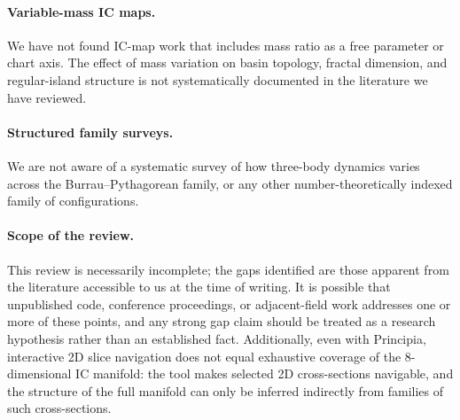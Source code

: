 \documentclass[11pt,a4paper]{article}
\begin{document}
\paragraph{Variable-mass IC maps.}
We have not found IC-map work that includes mass ratio as a free parameter or chart axis.
The effect of mass variation on basin topology, fractal dimension, and regular-island structure
is not systematically documented in the literature we have reviewed.

\paragraph{Structured family surveys.}
We are not aware of a systematic survey of how three-body dynamics varies across the
Burrau--Pythagorean family, or any other number-theoretically indexed family of configurations.

\paragraph{Scope of the review.}
This review is necessarily incomplete; the gaps identified are those apparent from the
literature accessible to us at the time of writing.  It is possible that unpublished code,
conference proceedings, or adjacent-field work addresses one or more of these points, and any
strong gap claim should be treated as a research hypothesis rather than an established fact.
Additionally, even with Principia, interactive 2D slice navigation does not equal exhaustive
coverage of the 8-dimensional IC manifold: the tool makes selected 2D cross-sections navigable,
and the structure of the full manifold can only be inferred indirectly from families of such
cross-sections.
\end{document}
